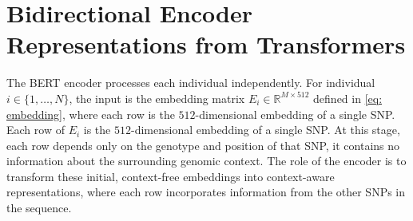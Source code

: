 \section{Bidirectional Encoder Representations from Transformers} \label{sec: BERT}

The BERT encoder processes each individual independently. For individual $i \in \{1, \dots, N\}$, the input is the embedding matrix $E_i \in \mathbb{R}^{M \times 512}$ defined in \eqref{eq: embedding}, where each row is the $512$-dimensional embedding of a single SNP. Each row of $E_i$ is the $512$-dimensional embedding of a single SNP. At this stage, each row depends only on the genotype and position of that SNP, it contains no information about the surrounding genomic context. The role of the encoder is to transform these initial, context-free embeddings into context-aware representations, where each row incorporates information from the other SNPs in the sequence.

